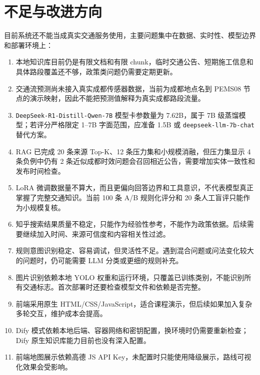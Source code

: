 \documentclass[bwprint]{report}
\begin{document}
\section{不足与改进方向}
目前系统还不能当成真实交通服务使用，主要问题集中在数据、实时性、模型边界和部署环境上：
\begin{enumerate}
    \item 本地知识库目前仍是有限文档和有限 chunk，临时交通公告、短期施工信息和具体路段覆盖还不够，政策类问题仍需要定期更新。
    \item 交通流预测尚未接入真实成都传感器数据，当前为成都地点名到 PEMS08 节点的演示映射，因此不能把预测值解释为真实成都路段流量。
    \item \texttt{DeepSeek-R1-Distill-Qwen-7B} 模型卡参数量为 7.62B，属于 7B 级蒸馏模型；若评分严格限定 1--7B 字面范围，应准备 1.5B 或 \texttt{deepseek-llm-7b-chat} 替代方案。
    \item RAG 已完成 20 条来源 Top-K、12 条压力集和小规模消融，但压力集显示 4 条负例中仍有 2 条近似成都时效问题会召回相近公告，需要增加实体一致性和发布时间检查。
    \item LoRA 微调数据量不算大，而且更偏向回答边界和工具意识，不代表模型真正掌握了完整交通知识。当前 100 条 A/B 规则化评分和 20 条人工盲评只能作为小规模复核。
    \item 知乎搜索结果质量不稳定，只能作为经验性参考，不能作为政策依据。后续需要继续加入时间、来源可信度和内容相关性过滤。
    \item 规则意图识别稳定、容易调试，但灵活性不足。遇到混合问题或问法变化较大的问题时，仍可能需要 LLM 分类或更细的规则补充。
    \item 图片识别依赖本地 YOLO 权重和运行环境，只覆盖已训练类别，不能识别所有交通标志。首次部署时还要检查模型文件和依赖是否完整。
    \item 前端采用原生 HTML/CSS/JavaScript，适合课程演示，但后续如果加入复杂多轮交互，维护成本会提高。
    \item Dify 模式依赖本地后端、容器网络和密钥配置，换环境时仍需要重新检查；Dify 原生知识库能力目前也没有深入配置。
    \item 前端地图展示依赖高德 JS API Key，未配置时只能使用降级展示，路线可视化效果会受影响。
\end{enumerate}
\end{document}
